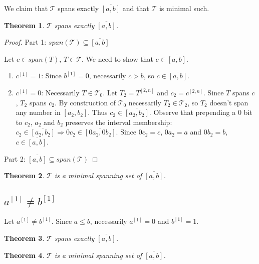 \documentclass{article}
\theoremstyle{plain}
\newtheorem{theorem}{Theorem}[subsection]
\theoremstyle{definition}
\newcommand{\interval}[2]{[#1, #2]}
\newcommand{\finterval}[2]{\overline{\interval{#1}{#2}}}
\newcommand{\bit}[2]{#1^{[#2]}}
\newcommand{\bits}[3]{#1^{\interval{#2}{#3}}}
\begin{document}
We claim that $\mathcal{T}$ spans exactly $\finterval{a}{b}$
and that $\mathcal{T}$ is minimal such. %

\begin{theorem}
$\mathcal{T}$ spans exactly $\finterval{a}{b}$.
\end{theorem}

\begin{proof}
Part 1: $span(\mathcal{T}) \subseteq \finterval{a}{b}$

Let $c \in span(T)$, $T \in \mathcal{T}$.
We need to show that $c \in \finterval{a}{b}$.

\begin{enumerate}
\item $\bit{c}{1} = 1$: Since $\bit{b}{1} = 0$, necessarily $c > b$, so $c \in \finterval{a}{b}$.
\item $\bit{c}{1} = 0$: Necessarily $T \in \mathcal{T}_0$.
Let $T_2 = \bits{T}{2}{n}$ and $c_2 = \bits{c}{2}{n}$.
Since $T$ spans $c$, $T_2$ spans $c_2$.
By construction of $\mathcal{T}_0$ necessarily $T_2 \in \mathcal{T}_2$,
so $T_2$ doesn't span any number in $\interval{a_2}{b_2}$.
Thus $c_2 \in \finterval{a_2}{b_2}$.
Observe that prepending a $0$ bit to $c_2$, $a_2$ and $b_2$ preserves the interval membership:
$c_2 \in \finterval{a_2}{b_2} \Rightarrow 0 c_2 \in \finterval{0 a_2}{0 b_2}$.
Since $0 c_2 = c$, $0 a_2 = a$ and $0 b_2 = b$,
$c \in \finterval{a}{b}$.
\end{enumerate}

Part 2: $\finterval{a}{b} \subseteq span(\mathcal{T})$
\end{proof}

\begin{theorem}
$\mathcal{T}$ is a minimal spanning set of $\finterval{a}{b}$.
\end{theorem}


\subsection{$\bit{a}{1} \neq \bit{b}{1}$}
Let $\bit{a}{1} \neq \bit{b}{1}$.
Since $a \leq b$, necessarily $\bit{a}{1} = 0$ and $\bit{b}{1} = 1$.


\begin{theorem}
$\mathcal{T}$ spans exactly $\finterval{a}{b}$.
\end{theorem}

\begin{theorem}
$\mathcal{T}$ is a minimal spanning set of $\finterval{a}{b}$.
\end{theorem}




\printglossaries
\end{document}
